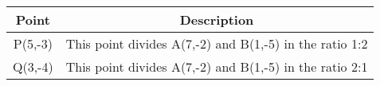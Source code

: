 \begin{tabular}{|c|c|}
\hline
Point & Description \\  \hline
P(5,-3) & This point divides A(7,-2) and B(1,-5) in the ratio 1:2 \\
	\hline
Q(3,-4) & This point divides A(7,-2) and B(1,-5) in the ratio 2:1 \\  
	\hline
\end{tabular}

